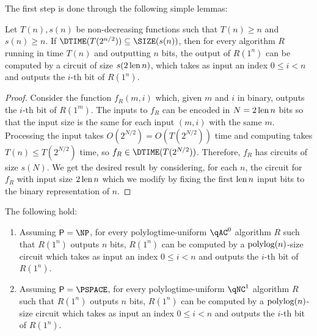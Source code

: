 The first step is done through the following simple lemmas:

\begin{lemma}
	\label{lem:circuitbinarytounary}
	Let $T(n), s(n)$ be non-decreasing functions such that $T(n) \geq n$ and $s(n) \geq n$. 
	If $\DTIME(T(2^{n/2})) \subseteq \SIZE(s(n))$,
	then for every algorithm $R$ running in time $T(n)$ and outputting $n$ bits,
	the output of $R(1^n)$ can be computed by a circuit of size $s(2 \operatorname{len} n)$,
	which takes as input an index $0 \leq i < n$ and outputs the $i$-th bit of $R(1^n)$.
\end{lemma}
\begin{proof}
Consider the function $f_R(m, i)$ which, given $m$ and $i$ in binary, outputs the $i$-th bit of $R(1^m)$. The inputs to $f_R$ can 
be encoded in $N = 2 \operatorname{len} n$ bits so that the input size is the same for each input $(m, i)$ with the same $m$.
Processing the input takes $O(2^{N/2}) = O(T(2^{N/2}))$ time and computing takes $T(n) \leq T(2^{N/2})$ time, so
$f_R \in \DTIME(T(2^{N/2}))$. 
Therefore, $f_R$ has circuits of size $s(N)$. 
We get the desired result by considering, for each $n$, the circuit for $f_R$ with input size $2 \operatorname{len} n$
which we modify by fixing the first $\operatorname{len} n$ input 
bits to the binary representation of $n$. 
\end{proof}

\begin{lemma}
	\label{lem:acbinarytounary}
	The following hold:
	\begin{enumerate}
		\item Assuming $\PTIME = \NP$, for every polylogtime-uniform $\qAC^0$ algorithm $R$
		such that $R(1^n)$ outputs $n$ bits, $R(1^n)$ can be computed by a $\text{polylog}(n)$-size circuit
		which takes as input an index $0 \leq i < n$ and outputs the $i$-th bit of $R(1^n)$.
		\item Assuming $\PTIME = \PSPACE$, for every polylogtime-uniform $\qNC^1$ algorithm
		$R$ such that $R(1^n)$ outputs $n$ bits, $R(1^n)$ can be computed by a $\text{polylog}(n)$-size circuit
		which takes as input an index $0 \leq i < n$ and outputs the $i$-th bit of $R(1^n)$.
	\end{enumerate}
\end{lemma}

